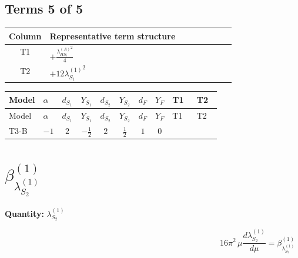 \documentclass[8pt]{article}
\begin{document}
\begin{landscape}
\subsection*{Terms 5 of 5}
\begin{center}
\begin{tabular}{@{}c >{\raggedright\arraybackslash}p{0.82\linewidth}@{}}
\toprule
Column & Representative term structure \\
\midrule
T1 & \(\displaystyle +\frac{{\lambda_{HS_1}^{(A)}}^2}{4}\) \\
\midrule
T2 & \(\displaystyle +12 {\lambda_{S_1}^{(1)}}^2\) \\
\midrule
\bottomrule
\end{tabular}
\end{center}
\smallskip
\tiny
\begin{longtable}{@{}llcccccc >{\raggedright\arraybackslash}p{0.21\linewidth} >{\raggedright\arraybackslash}p{0.21\linewidth}@{}}
\toprule
Model & $\alpha$ & $d_{S_1}$ & $Y_{S_1}$ & $d_{S_2}$ & $Y_{S_2}$ & $d_F$ & $Y_F$ & T1 & T2 \\
\midrule
\endfirsthead
\toprule
Model & $\alpha$ & $d_{S_1}$ & $Y_{S_1}$ & $d_{S_2}$ & $Y_{S_2}$ & $d_F$ & $Y_F$ & T1 & T2 \\
\midrule
\endhead
T3-B & $-1$ & $2$ & $-\frac{1}{2}$ & $2$ & $\frac{1}{2}$ & $1$ & $0$ & \scriptsize\adjustbox{max width=\linewidth}{$\begin{gathered} +\frac{{\lambda_{HS_1}^{(A)}}^2}{4}\end{gathered}$} & \scriptsize\adjustbox{max width=\linewidth}{$\begin{gathered} +12 {\lambda_{S_1}^{(1)}}^2\end{gathered}$} \\
\midrule
\bottomrule
\end{longtable}
\clearpage
\section*{$\beta_{\lambda_{S_2}^{(1)}}^{(1)}$}
\noindent\textbf{Quantity: }$\lambda_{S_2}^{(1)}$\par\smallskip
\[16\pi^2\,\mu\frac{d \lambda_{S_2}^{(1)}}{d\mu}=\beta_{\lambda_{S_2}^{(1)}}^{(1)}\]

\end{landscape}
\end{document}
